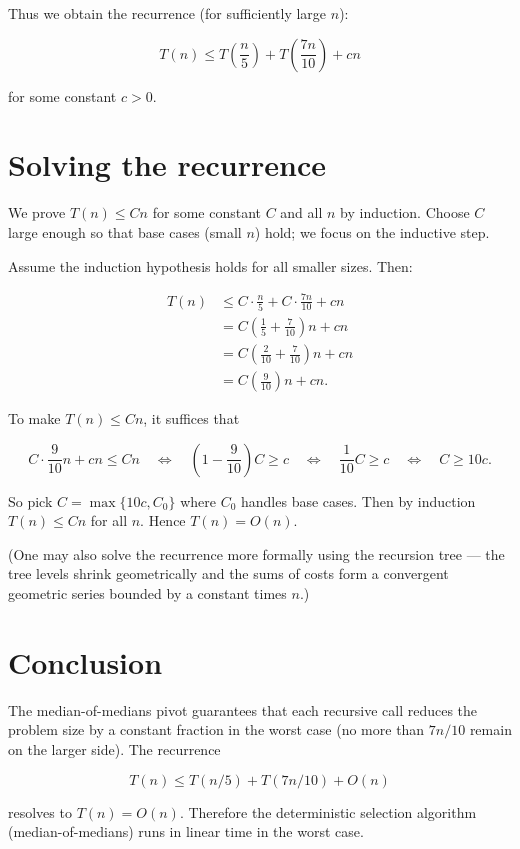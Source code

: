 \documentclass[11pt]{article}
\begin{document}
Thus we obtain the recurrence (for sufficiently large \(n\)):

\[
T(n) \le T\!\left(\frac{n}{5}\right) + T\!\left(\frac{7n}{10}\right) + cn
\]

for some constant \(c>0\).

\section*{Solving the recurrence}
We prove \(T(n) \le C n\) for some constant \(C\) and all \(n\) by induction. Choose \(C\) large enough so that base cases (small \(n\)) hold; we focus on the inductive step.

Assume the induction hypothesis holds for all smaller sizes. Then:

\[
\begin{aligned}
T(n)
&\le C\cdot\frac{n}{5} + C\cdot\frac{7n}{10} + cn \\
&= C\left(\frac{1}{5} + \frac{7}{10}\right)n + cn \\
&= C\left(\frac{2}{10} + \frac{7}{10}\right)n + cn \\
&= C\left(\frac{9}{10}\right)n + cn.
\end{aligned}
\]

To make \(T(n) \le Cn\), it suffices that

\[
C\cdot\frac{9}{10} n + c n \le C n
\quad\Longleftrightarrow\quad
\left(1 - \frac{9}{10}\right)C \ge c
\quad\Longleftrightarrow\quad
\frac{1}{10}C \ge c
\quad\Longleftrightarrow\quad
C \ge 10c.
\]

So pick \(C = \max\{10c, C_0\}\) where \(C_0\) handles base cases. Then by induction \(T(n) \le Cn\) for all \(n\). Hence \(T(n)=O(n)\).

(One may also solve the recurrence more formally using the recursion tree — the tree levels shrink geometrically and the sums of costs form a convergent geometric series bounded by a constant times \(n\).)

\section*{Conclusion}
The median-of-medians pivot guarantees that each recursive call reduces the problem size by a constant fraction in the worst case (no more than \(7n/10\) remain on the larger side). The recurrence

\[
T(n) \le T(n/5) + T(7n/10) + O(n)
\]

resolves to \(T(n) = O(n)\). Therefore the deterministic selection algorithm (median-of-medians) runs in linear time in the worst case.
\end{document}

